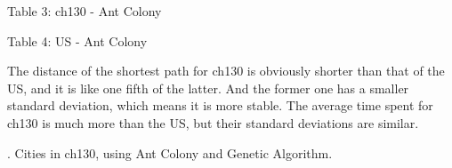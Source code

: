 \documentclass{article}
\begin{document}
\begin{center}
    Table 3: ch130 - Ant Colony
\end{center}
\begin{center}

\begin{center}
    Table 4: US - Ant Colony
\end{center}
\end{center}

The distance of the shortest path for ch130 is obviously shorter than that of the US, and it is like one fifth of the latter. And the former one has a smaller standard deviation, which means it is more stable. The average time spent for ch130 is much more than the US, but their standard deviations are similar.

. Cities in ch130, using Ant Colony and Genetic Algorithm. 
\end{document}
